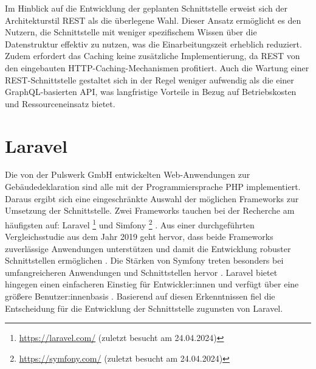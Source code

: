 \documentclass[draft,final]{vutinfth} %
\begin{document}
Im Hinblick auf die Entwicklung der geplanten Schnittstelle erweist sich der Architekturstil REST als die überlegene Wahl. 
Dieser Ansatz ermöglicht es den Nutzern, die Schnittstelle mit weniger spezifischem Wissen über die Datenstruktur effektiv zu nutzen, was die Einarbeitungszeit erheblich reduziert. 
Zudem erfordert das Caching keine zusätzliche Implementierung, da REST von den eingebauten HTTP-Caching-Mechanismen profitiert. 
Auch die Wartung einer REST-Schnittstelle gestaltet sich in der Regel weniger aufwendig als die einer GraphQL-basierten API, was langfristige Vorteile in Bezug auf Betriebskosten und Ressourceneinsatz bietet.


\section{Laravel}

Die von der Pulswerk GmbH entwickelten Web-Anwendungen zur Gebäudedeklaration sind alle mit der Programmiersprache PHP implementiert.
Daraus ergibt sich eine eingeschränkte Auswahl der möglichen Frameworks zur Umsetzung der Schnittstelle.
Zwei Frameworks tauchen bei der Recherche am häufigsten auf: Laravel
\footnote{
	\url{https://laravel.com/} (zuletzt besucht am 24.04.2024)
}
und Simfony
\footnote{
	\url{https://symfony.com/} (zuletzt besucht am 24.04.2024)
}
. 
Aus einer durchgeführten Vergleichsstudie aus dem Jahr 2019 geht hervor, dass beide Frameworks zuverlässige Anwendungen unterstützen und damit die Entwicklung robuster Schnittstellen ermöglichen \cite{Laaziri:2019:LaravelVsSymfony}. 
Die Stärken von Symfony treten besonders bei umfangreicheren Anwendungen und Schnittstellen hervor \cite{Laaziri:2019:LaravelVsSymfony}. 
Laravel bietet hingegen einen einfacheren Einstieg für Entwickler:innen und verfügt über eine größere Benutzer:innenbasis \cite{Laaziri:2019:LaravelVsSymfony}. 
Basierend auf diesen Erkenntnissen fiel die Entscheidung für die Entwicklung der Schnittstelle zugunsten von Laravel.
\end{document}
